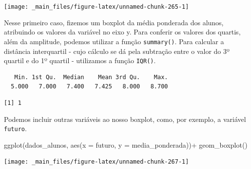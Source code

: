 \documentclass[
  brazilian,
]{book}
\newenvironment{Shaded}{\begin{snugshade}}{\end{snugshade}}
\newcommand{\AttributeTok}[1]{\textcolor[rgb]{0.77,0.63,0.00}{#1}}
\newcommand{\FunctionTok}[1]{\textcolor[rgb]{0.00,0.00,0.00}{#1}}
\newcommand{\NormalTok}[1]{#1}
\newcommand{\SpecialCharTok}[1]{\textcolor[rgb]{0.00,0.00,0.00}{#1}}
\begin{document}
\begin{center}\texttt{[image: \_main\_files/figure-latex/unnamed-chunk-265-1]} \end{center}

Nesse primeiro caso, fizemos um boxplot da média ponderada dos alunos, atribuindo os valores da variável no eixo y. Para conferir os valores dos quartis, além da amplitude, podemos utilizar a função \texttt{summary()}. Para calcular a distância interquartil - cujo cálculo se dá pela subtração entre o valor do 3º quartil e do 1º quartil - utilizamos a função \texttt{IQR()}.

\begin{Shaded}
\end{Shaded}

\begin{verbatim}
   Min. 1st Qu.  Median    Mean 3rd Qu.    Max. 
  5.000   7.000   7.400   7.425   8.000   8.700 
\end{verbatim}

\begin{Shaded}
\end{Shaded}

\begin{verbatim}
[1] 1
\end{verbatim}

Podemos incluir outras variáveis ao nosso boxplot, como, por exemplo, a variável \texttt{futuro}.

\begin{Shaded}
\begin{Highlighting}[]
\FunctionTok{ggplot}\NormalTok{(dados\_alunos,}
       \FunctionTok{aes}\NormalTok{(}\AttributeTok{x =}\NormalTok{ futuro,}
           \AttributeTok{y =}\NormalTok{ media\_ponderada))}\SpecialCharTok{+}
  \FunctionTok{geom\_boxplot}\NormalTok{()}
\end{Highlighting}
\end{Shaded}

\begin{center}\texttt{[image: \_main\_files/figure-latex/unnamed-chunk-267-1]} \end{center}
\end{document}

